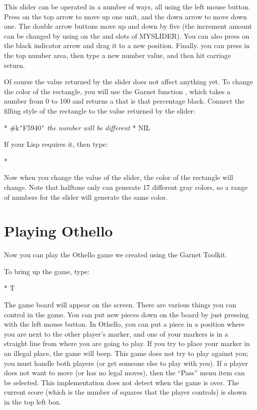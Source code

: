 This slider can be operated in a number of ways, all using the left mouse
button.  Press on the top arrow to move up one unit, and the down arrow to
move down one.  The double arrow buttons move up and down by five (the
increment amount can be changed by using  on the
 and  slots of MYSLIDER).  You can
also press on
the black indicator arrow and drag it to a new position.  Finally. you can
press in the top number area, then type a new number value, and then hit
carriage return.

Of course the value returned by the slider does not affect anything yet.
To change the color of the rectangle, you will use the Garnet function
, which takes a number from 0 to 100 and returns a
 that is that percentage black.  Connect the filling
style of the rectangle to the value returned by the slider:

\begin{programexample}
* 
\#k{\tt\char`\<}F5940{\tt\char`\>}   {\it the number will be different}
* 
NIL
\end{programexample}
If your Lisp requires it, then type:
\begin{programexample}
* 
\end{programexample}

Now when you change the value of the slider, the color of the rectangle
will change.  Note that halftone only can generate 17 different gray
colors, so a range of numbers for the slider will generate the same color.

\chapter{Playing Othello}
\label{Othello}

Now you can play the Othello game we created using the Garnet Toolkit.

To bring up the game, type:
\begin{programexample}
* 
T
\end{programexample}
The game board will appear on the
screen.  There are various things you can control in the game.  You can put
new pieces down on the board by just pressing with the left mouse button.
In Othello, you can put a piece in a position where you are next to the
other player's marker, and one of your markers is in a straight line from
where you are going to play.
If you try to place your marker in an illegal place, the
game will beep.  This game does not try to play against you; you must
handle both players (or get someone else to play with you).
If a player does not want to move (or has no legal moves), then the
``Pass'' menu item can be selected.  This implementation does not detect
when the game is over.  The current score (which is the number of squares
that the player controls) is shown in the top left box.

